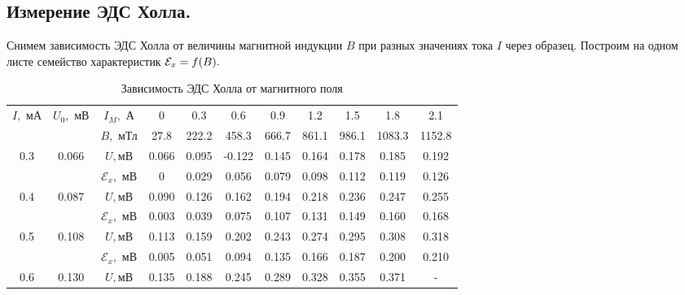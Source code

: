 \documentclass[a4paper, 12pt, twoside]{article}
\newcommand*{\hm}[1]{#1\nobreak\discretionary{} 
	{\hbox{$\mathsurround=0pt #1$}}{}}
\begin{document}
\subsection{Измерение ЭДС Холла.}
Снимем зависимость ЭДС Холла от величины магнитной индукции $B$ при разных значениях тока $I$ через образец. Построим на одном листе семейство характеристик $\mathcal{E}_x \hm{=} f(B).$
\begin{table}[H]
	\centering
	\label{my-label}
	\caption{Зависимость ЭДС Холла от магнитного поля}
	\begin{tabular}{c|c|c|c|c|c|c|c|c|c|c}
		\toprule
		\multirow{2}{*}{$I, \text{ мА}$} & \multirow{2}{*}{$U_0, \text{ мВ}$} & $I_M, \text{ А}$                                                      & 0    & 0.3    & 0.6    & 0.9    & 1.2    & 1.5   & 1.8    & 2.1    \\%
		&                                    & $B, \text{ мТл}$                                                        & 27.8  & 222.2  & 458.3  & 666.7  & 861.1  & 986.1  & 1083.3  & 1152.8  \\ \midrule
		\multirow{2}{*}{0.3}             & \multirow{2}{*}{0.066}              & $U, \text{мВ}$                                                         & 0.066  & 0.095 & -0.122 & 0.145 & 0.164 & 0.178 & 0.185 & 0.192 \\%
		&                                    & $\mathcal{E}_x,$  $ \text{мВ}$ & 0 & 0.029 & 0.056 & 0.079 & 0.098 & 0.112 & 0.119 & 0.126 \\ \midrule	
		\multirow{2}{*}{0.4}             & \multirow{2}{*}{0.087}             & $U, \text{мВ}$                                                         & 0.090  & 0.126 & 0.162 & 0.194 & 0.218 & 0.236 & 0.247 & 0.255 \\%
		&                                    & $\mathcal{E}_x,$   $\text{мВ}$& 0.003 & 0.039 & 0.075 & 0.107 & 0.131 & 0.149 & 0.160 & 0.168 \\ \midrule
		\multirow{2}{*}{0.5}             & \multirow{2}{*}{0.108}             & $U, \text{мВ}$                                                         & 0.113  & 0.159 & 0.202 & 0.243  & 0.274 & 0.295 & 0.308 & 0.318 \\%
		&                                    & $\mathcal{E}_x,$   $\text{мВ}$ & 0.005 & 0.051 & 0.094 & 0.135  & 0.166 & 0.187 & 0.200 & 0.210 \\ \midrule
		\multirow{2}{*}{0.6}             & \multirow{2}{*}{0.130}             & $U, \text{мВ}$                                                         & 0.135  & 0.188 & 0.245 & 0.289 & 0.328 & 0.355 & 0.371 & - \\%

\end{tabular}
\end{table}
\end{document}
